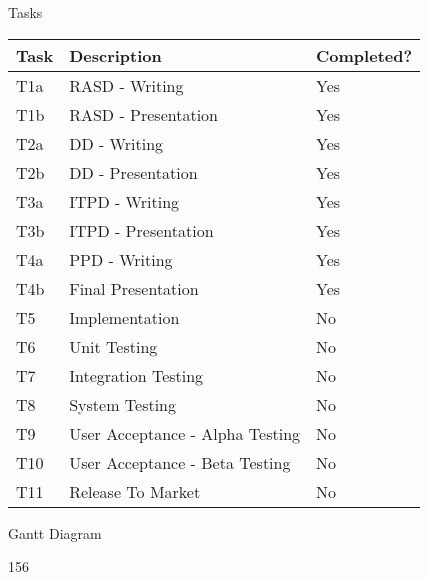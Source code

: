 \documentclass{../common/latex_classes/pdf_presentation}
\begin{document}
	\begin{frame}{Tasks}
		\begin{tabulary}{\linewidth\tymin=70pt}{Y{2cm}|Y{6cm}|Y{2.25cm}}
			\textbf{Task} & \textbf{Description} & \textbf{Completed?}\\ \hline
			T1a & RASD - Writing & Yes \\ \hline
			T1b & RASD - Presentation & Yes \\ \hline
			T2a & DD - Writing & Yes \\ \hline
			T2b & DD - Presentation & Yes \\ \hline
			T3a & ITPD - Writing & Yes \\ \hline
			T3b & ITPD - Presentation & Yes \\ \hline
			T4a & PPD - Writing & Yes \\ \hline
			T4b & Final Presentation & Yes \\ \hline
			T5 & Implementation & No \\ \hline
			T6 & Unit Testing & No \\ \hline
			T7 & Integration Testing & No \\ \hline
			T8 & System Testing & No \\ \hline
			T9 & User Acceptance - Alpha Testing & No \\ \hline
			T10 & User Acceptance - Beta Testing & No \\ \hline
			T11 & Release To Market & No \\
		\end{tabulary}
	\end{frame}
	\begin{frame}{Gantt Diagram}
		\begin{ganttchart}[hgrid=true, x unit=1.8mm, vgrid={*3{draw=none}, dotted}, y unit chart=3.75mm, link bulge=1]{1}{56}
			  \\
			\\
			 \\
			 \\
			 \\
			 \\
			 \\
			 \\
			 \\
			 \\
			 \\
			 \\
			 \\
			 \\
			 \\
			 \\
		\end{ganttchart}
	\end{frame}
\end{document}

